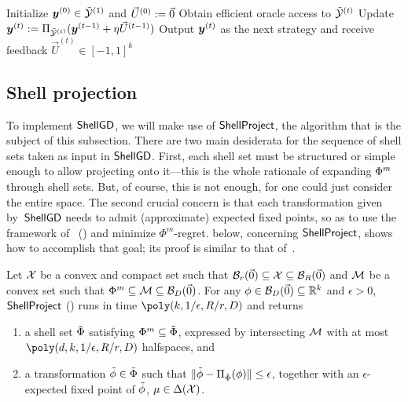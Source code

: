 \begin{algorithm}[!ht]
\caption{$\shellgd$~\citep{Daskalakis24:Efficient}}
\label{alg:shellgd}
\;
Initialize ${\bm{y}}^{(0)} \in \tilde{{\mathcal{Y}}}^{(1)}$ and $\vec{U}^{(0)} := \vec{0}$\;
  {
    Obtain efficient oracle access to $\tilde{{\mathcal{Y}}}^{(t)}$\;
    Update ${\bm{y}}^{(t)} := \Pi_{\tilde{{\mathcal{Y}}}^{(t)}}( {\bm{y}}^{(t-1)} + \eta \vec{U}^{(t-1)})$\;
    Output ${\bm{y}}^{(t)}$ as the next strategy and receive feedback $\vec{U}^{(t)} \in [-1, 1]^k$
 }
\end{algorithm}

\subsection{Shell projection}
\label{sec:shellproj}

To implement $\shellgd$, we will make use of $\textsf{ShellProject}$, the algorithm that is the subject of this subsection. There are two main desiderata for the sequence of shell sets taken as input in $\shellgd$. First, each shell set must be structured or simple enough to allow projecting onto it---this is the whole rationale of expanding $\Phi^m$ through shell sets. But, of course, this is not enough, for one could just consider the entire space. The second crucial concern is that each transformation given by~$\shellgd$ needs to admit (approximate) expected fixed points, so as to use the framework of~\citet{Gordon08:No} () and minimize $\Phi^m$-regret.  below, concerning $\textsf{ShellProject}$, shows how to accomplish that goal; its proof is similar to that of~\citet[Theorem 4.4]{Daskalakis24:Efficient}.

\begin{lemma}
    \label{lemma:shellproj}
    Let ${\mathcal{X}}$ be a convex and compact set such that ${\mathcal{B}}_{r}(\vec{0}) \subseteq {\mathcal{X}} \subseteq {\mathcal{B}}_R(\vec{0})$ and ${\mathcal{M}}$ be a convex set such that $\Phi^m \subseteq {\mathcal{M}} \subseteq {\mathcal{B}}_D(\vec{0})$. For any $\phi \in {\mathcal{B}}_D(\vec{0}) \subseteq \mathbb R^k$ and $\epsilon > 0$, $\textsf{ShellProject}$ () runs in time $\poly(k, 1/\epsilon, R/r, D)$ and returns
    \begin{enumerate}
        \item a shell set $\tilde{\Phi}$ satisfying $\Phi^m \subseteq \tilde{\Phi}$, expressed by intersecting ${\mathcal{M}}$ with at most $\poly(d, k, 1/\epsilon, R/r, D)$ halfspaces, and\label{item:invar}
        \item a transformation $\tilde{\phi} \in \tilde{\Phi}$ such that $\| \tilde{\phi} - \Pi_{\tilde{\Phi}}(\phi) \| \leq \epsilon$, together with an $\epsilon$-expected fixed point of $\tilde{\phi}$, $\mu \in \Delta({\mathcal{X}})$.\label{item:proj}
    \end{enumerate}
\end{lemma}

